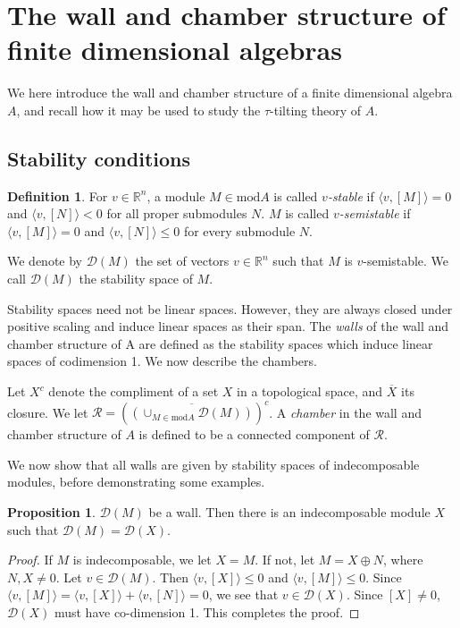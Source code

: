 \documentclass[]{article}
\theoremstyle{definition}
\newtheorem{definition}{Definition}[section]
\newtheorem{proposition}{Proposition}[section]
\newcommand{\tu}{\ensuremath{\tau}}
\begin{document}
\section{The wall and chamber structure of finite dimensional algebras}
We here introduce the wall and chamber structure of a finite dimensional algebra $A$, and recall how it may be used to study the \tu-tilting theory of $A$.

\subsection{Stability conditions}

\begin{definition}
	For $v \in \mathbb{R}^n$, a module $M \in \text{mod} A$ is called \textit{$v$-stable} if $\langle v,[M]\rangle = 0$ and $\langle v,[N]\rangle < 0$ for all proper submodules $N$. $M$ is called \textit{$v$-semistable} if $\langle v, [M]\rangle = 0$ and $\langle v, [N]\rangle \leq 0$ for every submodule $N$.
\end{definition}

We denote by $\mathcal{D}(M)$ the set of vectors $v \in \mathbb{R}^n$ such that $M$ is $v$-semistable. We call $\mathcal{D}(M)$ the stability space of $M$.


Stability spaces need not be linear spaces. However, they are always closed under positive scaling and induce linear spaces as their span. The \textit{walls} of the wall and chamber structure of A are defined as the stability spaces which induce linear spaces of codimension 1. We now describe the chambers.

Let $X^c$ denote the compliment of a set $X$ in a topological space, and $\overline{X}$ its closure. We let $\mathcal{R} = (\overline{(\cup_{M \in \text{mod} A} \mathcal{D}(M))})^c$. A \textit{chamber} in the wall and chamber structure of $A$ is defined to be a connected component of $\mathcal{R}$.

We now show that all walls are given by stability spaces of indecomposable modules, before demonstrating some examples.

\begin{proposition}
	$\mathcal{D}(M)$ be a wall. Then there is an indecomposable module $X$ such that $\mathcal{D}(M) = \mathcal{D}(X)$.
\end{proposition}

\begin{proof}
	If $M$ is indecomposable, we let $X = M$. If not, let $M = X\oplus N$, where $N,X \neq 0$. Let $v \in \mathcal{D}(M)$. Then $\langle v,[X]\rangle \leq 0$ and $\langle v,[M]\rangle \leq 0$. Since $\langle v,[M]\rangle = \langle v,[X]\rangle + \langle v,[N]\rangle = 0$, we see that $v \in \mathcal{D}(X)$. Since $[X] \neq 0$, $\mathcal{D}(X)$ must have co-dimension 1. This completes the proof.
\end{proof}
\end{document}
